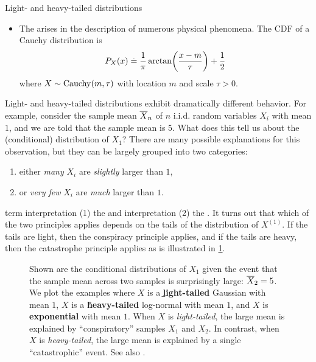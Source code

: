 \begin{ex}{Light- and heavy-tailed distributions}{}
\begin{itemize}
    \item The  arises in the description of numerous physical phenomena.
    The CDF of a Cauchy distribution is \begin{align}
      P_X(x) \defeq \frac{1}{\pi} \arctan\parentheses*{\frac{x - m}{\tau}} + \frac{1}{2}
    \end{align} where $X \sim \Cauchy{m}{\tau}$ with location $m$ and scale $\tau > 0$.
  \end{itemize}
\end{ex}

Light- and heavy-tailed distributions exhibit dramatically different behavior.
For example, consider the sample mean $\overline{X}_{n}$ of $n$ i.i.d. random variables $X_i$ with mean $1$, and we are told that the sample mean is $5$.
What does this tell us about the (conditional) distribution of $X_1$?
There are many possible explanations for this observation, but they can be largely grouped into two categories: \begin{enumerate}
  \item either \emph{many} $X_i$ are \emph{slightly} larger than $1$,
  \item or \emph{very few} $X_i$ are \emph{much} larger than $1$.
\end{enumerate}
\cite{nair2022fundamentals} term interpretation (1) the  and interpretation (2) the .
It turns out that which of the two principles applies depends on the tails of the distribution of $X^{(1)}$.
If the tails are light, then the conspiracy principle applies, and if the tails are heavy, then the catastrophe principle applies as is illustrated in \cref{fig:conspiracy_vs_catastrophe}.

\begin{figure}
	\caption{Shown are the conditional distributions of $X_1$ given the event that the sample mean across two samples is surprisingly large: $\overline{X}_2 = 5$. We plot the examples where $X$ is a \textbf{\b{light-tailed}} Gaussian with mean $1$, $X$ is a \textbf{\r{heavy-tailed}} log-normal with mean $1$, and $X$ is \textbf{exponential} with mean $1$. When $X$ is \emph{light-tailed}, the large mean is explained by ``conspiratory'' samples $X_1$ and $X_2$. In contrast, when $X$ is \emph{heavy-tailed}, the large mean is explained by a single ``catastrophic'' event. See also \cite{nair2022fundamentals}.}
  \label{fig:conspiracy_vs_catastrophe}
\end{figure}

